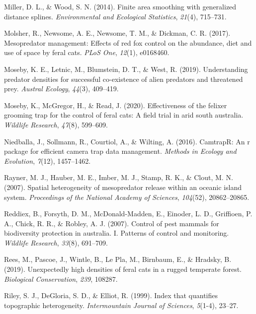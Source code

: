 \documentclass[]{elsarticle} %
\begin{document}
\leavevmode\hypertarget{ref-miller2014}{}%
Miller, D. L., \& Wood, S. N. (2014). Finite area smoothing with generalized distance splines. \emph{Environmental and Ecological Statistics}, \emph{21}(4), 715--731.

\leavevmode\hypertarget{ref-molsher2017}{}%
Molsher, R., Newsome, A. E., Newsome, T. M., \& Dickman, C. R. (2017). Mesopredator management: Effects of red fox control on the abundance, diet and use of space by feral cats. \emph{PLoS One}, \emph{12}(1), e0168460.

\leavevmode\hypertarget{ref-moseby2019}{}%
Moseby, K. E., Letnic, M., Blumstein, D. T., \& West, R. (2019). Understanding predator densities for successful co-existence of alien predators and threatened prey. \emph{Austral Ecology}, \emph{44}(3), 409--419.

\leavevmode\hypertarget{ref-moseby2020effectiveness}{}%
Moseby, K., McGregor, H., \& Read, J. (2020). Effectiveness of the felixer grooming trap for the control of feral cats: A field trial in arid south australia. \emph{Wildlife Research}, \emph{47}(8), 599--609.

\leavevmode\hypertarget{ref-niedballa2016}{}%
Niedballa, J., Sollmann, R., Courtiol, A., \& Wilting, A. (2016). CamtrapR: An r package for efficient camera trap data management. \emph{Methods in Ecology and Evolution}, \emph{7}(12), 1457--1462.

\leavevmode\hypertarget{ref-rayner2007}{}%
Rayner, M. J., Hauber, M. E., Imber, M. J., Stamp, R. K., \& Clout, M. N. (2007). Spatial heterogeneity of mesopredator release within an oceanic island system. \emph{Proceedings of the National Academy of Sciences}, \emph{104}(52), 20862--20865.

\leavevmode\hypertarget{ref-reddiex2007}{}%
Reddiex, B., Forsyth, D. M., McDonald-Madden, E., Einoder, L. D., Griffioen, P. A., Chick, R. R., \& Robley, A. J. (2007). Control of pest mammals for biodiversity protection in australia. I. Patterns of control and monitoring. \emph{Wildlife Research}, \emph{33}(8), 691--709.

\leavevmode\hypertarget{ref-rees2019}{}%
Rees, M., Pascoe, J., Wintle, B., Le Pla, M., Birnbaum, E., \& Hradsky, B. (2019). Unexpectedly high densities of feral cats in a rugged temperate forest. \emph{Biological Conservation}, \emph{239}, 108287.

\leavevmode\hypertarget{ref-riley1999}{}%
Riley, S. J., DeGloria, S. D., \& Elliot, R. (1999). Index that quantifies topographic heterogeneity. \emph{Intermountain Journal of Sciences}, \emph{5}(1-4), 23--27.
\end{document}
